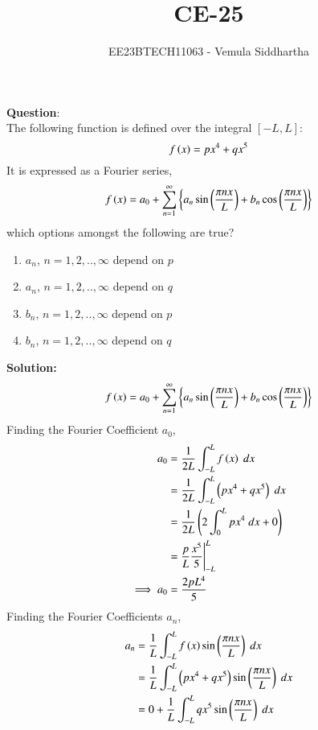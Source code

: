 \documentclass[journal,12pt,twocolumn]{IEEEtran}
\theoremstyle{remark}
\begin{document}

\vspace{3cm}

\title{CE-25}
\author{EE23BTECH11063 - Vemula Siddhartha}
\maketitle
\newpage
\bigskip

\renewcommand{\thefigure}{\theenumi}
\renewcommand{\thetable}{\theenumi}
\textbf{Question}:\\
The following function is defined over the integral $[-L,L]$:
    $$f\left(x\right)=px^4+qx^5$$
It is expressed as a Fourier series,
    $$f\left(x\right)=a_0+\sum_{n=1}^{\infty}\left\{a_n\sin\left(\frac{\pi n x}{L}\right)+b_n\cos\left(\frac{\pi n x}{L}\right)\right\}$$
which options amongst the following are true?
\begin{enumerate}[label=(\alph*)]
    \item $a_n$, $n=1,2,..,\infty$ depend on $p$
    \item $a_n$, $n=1,2,..,\infty$ depend on $q$
    \item $b_n$, $n=1,2,..,\infty$ depend on $p$
    \item $b_n$, $n=1,2,..,\infty$ depend on $q$
\end{enumerate}
\textbf{Solution:}\\
\begin{align}
    f\left(x\right)=a_0+\sum_{n=1}^{\infty}\left\{a_n\sin\left(\frac{\pi n x}{L}\right)+b_n\cos\left(\frac{\pi n x}{L}\right)\right\}\label{eq:GATE_CE25_1}
\end{align}
Finding the Fourier Coefficient $a_0$,
\begin{align}
    a_0&=\frac{1}{2L}\int_{-L}^{L}f\left(x\right)\;dx\\
    &=\frac{1}{2L}\int_{-L}^{L}\left(px^4+qx^5\right)\;dx\\
    &=\frac{1}{2L}\left(2\int_{0}^{L}px^4\;dx+0\right)\\
    &=\frac{p}{L}\frac{x^5}{5}\Bigg|_{-L}^{L}\\
    \implies a_0&=\frac{2pL^4}{5}
\end{align}
Finding the Fourier Coefficients $a_n$,
\begin{align}
    a_n&=\frac{1}{L}\int_{-L}^{L}f\left(x\right) \sin\left(\frac{\pi n x}{L}\right)\;dx\\
    &=\frac{1}{L}\int_{-L}^{L}\left(px^4+qx^5\right)\sin\left(\frac{\pi n x}{L}\right)\;dx\\
    &=0+\frac{1}{L}\int_{-L}^{L}qx^5\sin\left(\frac{\pi n x}{L}\right)\;dx
\end{align}
\end{document}

